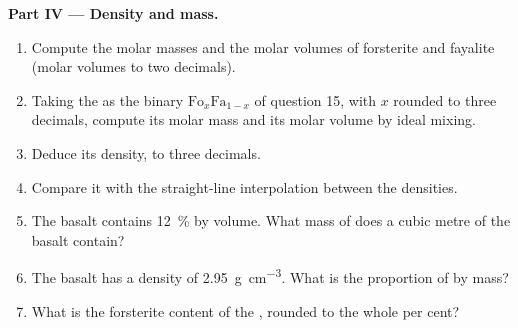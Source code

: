 \begin{problem}
\medskip
\noindent\textbf{Part IV --- Density and mass.}
\begin{enumerate}[resume]
  \item Compute the molar masses and the molar volumes of forsterite and
        fayalite (molar volumes to two decimals).
  \item Taking the  as the binary $\mathrm{Fo}_x\mathrm{Fa}_{1-x}$ of
        question 15, with $x$ rounded to three decimals, compute its molar
        mass and its molar volume by ideal mixing.
  \item Deduce its density, to three decimals.
  \item Compare it with the straight-line interpolation between the
         densities.
  \item The basalt contains \qty{12}{\percent}  by volume. What mass
        of  does a cubic metre of the basalt contain?
  \item The basalt has a density of \qty{2.95}{g.cm^{-3}}. What is the
        proportion of  by mass?
  \item What is the forsterite content of the , rounded to the whole
        per cent?
\end{enumerate}
\end{problem}
